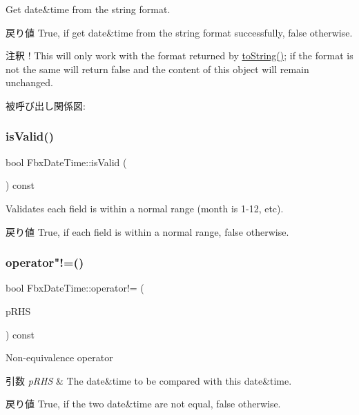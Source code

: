 Get date\&time from the string format. \begin{DoxyReturn}{戻り値}
{\ttfamily True}, if get date\&time from the string format successfully, {\ttfamily false} otherwise. 
\end{DoxyReturn}
\begin{DoxyRemark}{注釈}
! This will only work with the format returned by \hyperlink{class_fbx_date_time_a283a6c2397087698e188e421a4dc665d}{to\+String()}; if the format is not the same will return \textquotesingle{}false\textquotesingle{} and the content of this object will remain unchanged. 
\end{DoxyRemark}
被呼び出し関係図\+:
\mbox{\label{class_fbx_date_time_aa48abe1aea0780b94d0db51de1d3fcde}} 
\subsubsection{\texorpdfstring{is\+Valid()}{isValid()}}
{\footnotesize\ttfamily bool Fbx\+Date\+Time\+::is\+Valid (\begin{DoxyParamCaption}{ }\end{DoxyParamCaption}) const}

Validates each field is within a normal range (month is 1-\/12, etc). \begin{DoxyReturn}{戻り値}
{\ttfamily True}, if each field is within a normal range, {\ttfamily false} otherwise. 
\end{DoxyReturn}
\mbox{\label{class_fbx_date_time_a525927fe563bd071b4d4a1a45e1eb251}} 
\subsubsection{\texorpdfstring{operator"!=()}{operator!=()}}
{\footnotesize\ttfamily bool Fbx\+Date\+Time\+::operator!= (\begin{DoxyParamCaption}\item[{const \hyperlink{class_fbx_date_time}{Fbx\+Date\+Time} \&}]{p\+R\+HS }\end{DoxyParamCaption}) const}

Non-\/equivalence operator 
\begin{DoxyParams}{引数}
{\em p\+R\+HS} & The date\&time to be compared with this date\&time. \\
\hline
\end{DoxyParams}
\begin{DoxyReturn}{戻り値}
{\ttfamily True}, if the two date\&time are not equal, {\ttfamily false} otherwise. 
\end{DoxyReturn}
\mbox{\label{class_fbx_date_time_a881645b54b976cf8021a716b3046da96}} 
